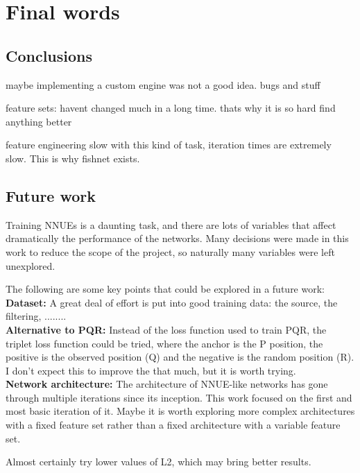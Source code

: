 \section{Final words}
\subsection{Conclusions}

maybe implementing a custom engine was not a good idea. bugs and stuff

feature sets: havent changed much in a long time. thats why it is so hard find anything better

feature engineering slow with this kind of task, iteration times are extremely slow. This is why fishnet exists.



\subsection{Future work}

Training NNUEs is a daunting task, and there are lots of variables that affect dramatically the performance of the networks. Many decisions were made in this work to reduce the scope of the project, so naturally many variables were left unexplored.

The following are some key points that could be explored in a future work: \\

\textbf{Dataset:}
A great deal of effort is put into good training data: the source, the filtering, ........ 
\\

\textbf{Alternative to PQR:} Instead of the loss function used to train PQR, the triplet loss function could be tried, where the anchor is the P position, the positive is the observed position (Q) and the negative is the random position (R). I don't expect this to improve the that much, but it is worth trying. \\

\textbf{Network architecture:} The architecture of NNUE-like networks has gone through multiple iterations since its inception. This work focused on the first and most basic iteration of it. Maybe it is worth exploring more complex architectures with a fixed feature set rather than a fixed architecture with a variable feature set.

Almost certainly try lower values of L2, which may bring better results.
